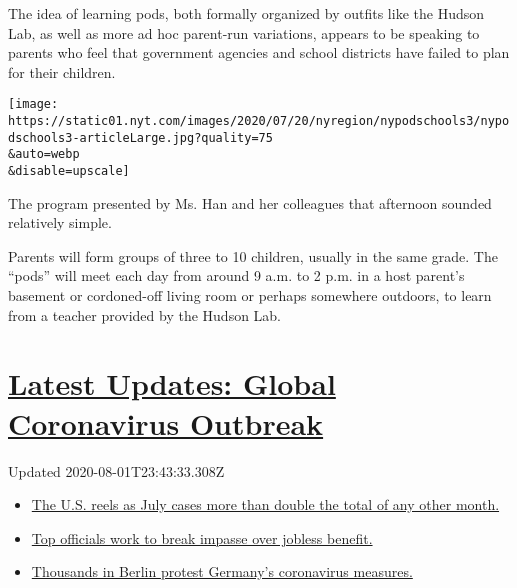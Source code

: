 The idea of learning pods, both formally organized by outfits like the
Hudson Lab, as well as more ad hoc parent-run variations, appears to be
speaking to parents who feel that government agencies and school
districts have failed to plan for their children.

\texttt{[image: https://static01.nyt.com/images/2020/07/20/nyregion/nypodschools3/nypodschools3-articleLarge.jpg?quality=75\\\&auto=webp\\\&disable=upscale]}

The program presented by Ms. Han and her colleagues that afternoon
sounded relatively simple.

Parents will form groups of three to 10 children, usually in the same
grade. The ``pods'' will meet each day from around 9 a.m. to 2 p.m. in a
host parent's basement or cordoned-off living room or perhaps somewhere
outdoors, to learn from a teacher provided by the Hudson Lab.

\hypertarget{latest-updates-global-coronavirus-outbreak}{%
\section{\texorpdfstring{\href{https://www.nytimes.com/2020/08/01/world/coronavirus-covid-19.html?action=click\&pgtype=Article\&state=default\&region=MAIN_CONTENT_1\&context=storylines_live_updates}{Latest
Updates: Global Coronavirus
Outbreak}}{Latest Updates: Global Coronavirus Outbreak}}\label{latest-updates-global-coronavirus-outbreak}}

Updated 2020-08-01T23:43:33.308Z

\begin{itemize}
\tightlist
\item
  \href{https://www.nytimes.com/2020/08/01/world/coronavirus-covid-19.html?action=click\&pgtype=Article\&state=default\&region=MAIN_CONTENT_1\&context=storylines_live_updates\#link-34047410}{The
  U.S. reels as July cases more than double the total of any other
  month.}
\item
  \href{https://www.nytimes.com/2020/08/01/world/coronavirus-covid-19.html?action=click\&pgtype=Article\&state=default\&region=MAIN_CONTENT_1\&context=storylines_live_updates\#link-3ac56579}{Top
  officials work to break impasse over jobless benefit.}
\item
  \href{https://www.nytimes.com/2020/08/01/world/coronavirus-covid-19.html?action=click\&pgtype=Article\&state=default\&region=MAIN_CONTENT_1\&context=storylines_live_updates\#link-25930521}{Thousands
  in Berlin protest Germany's coronavirus measures.}
\end{itemize}

